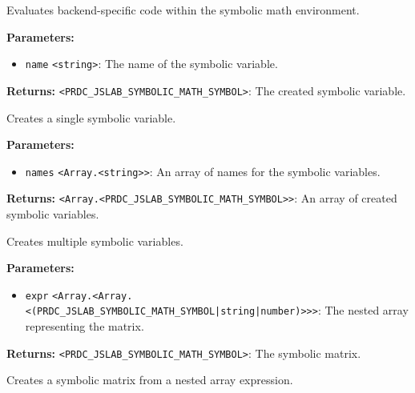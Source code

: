 \documentclass[12pt,a4paper]{article}
\begin{document}
\noindent Evaluates backend-specific code within the symbolic math environment.

\vspace{5mm}
\noindent {}


\noindent \textbf{Parameters:}
\begin{itemize}
  \item \texttt{name} \texttt{<string>}: The name of the symbolic variable.
\end{itemize}

\noindent \textbf{Returns:} \texttt{<PRDC\_JSLAB\_SYMBOLIC\_MATH\_SYMBOL>}: The created symbolic variable.

\noindent Creates a single symbolic variable.

\vspace{5mm}
\noindent {}


\noindent \textbf{Parameters:}
\begin{itemize}
  \item \texttt{names} \texttt{<Array.<string>>}: An array of names for the symbolic variables.
\end{itemize}

\noindent \textbf{Returns:} \texttt{<Array.<PRDC\_JSLAB\_SYMBOLIC\_MATH\_SYMBOL>>}: An array of created symbolic variables.

\noindent Creates multiple symbolic variables.

\vspace{5mm}
\noindent {}


\noindent \textbf{Parameters:}
\begin{itemize}
  \item \texttt{expr} \texttt{<Array.<Array.<(PRDC\_JSLAB\_SYMBOLIC\_MATH\_SYMBOL|string|number)>>>}: The nested array representing the matrix.
\end{itemize}

\noindent \textbf{Returns:} \texttt{<PRDC\_JSLAB\_SYMBOLIC\_MATH\_SYMBOL>}: The symbolic matrix.

\noindent Creates a symbolic matrix from a nested array expression.
\end{document}
